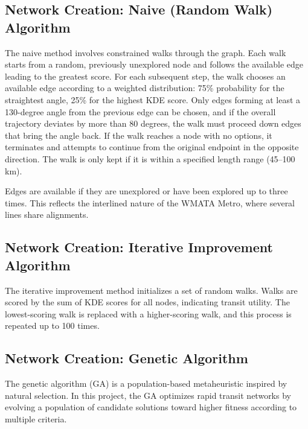 \documentclass[sigconf,nonacm]{acmart}
\begin{document}
\subsection{Network Creation: Naive (Random Walk) Algorithm}

The naive method involves constrained walks through the graph. Each walk starts from a random, previously unexplored node and follows the available edge leading to the greatest score. For each subsequent step, the walk chooses an available edge according to a weighted distribution: 75\% probability for the straightest angle, 25\% for the highest KDE score. Only edges forming at least a 130-degree angle from the previous edge can be chosen, and if the overall trajectory deviates by more than 80 degrees, the walk must proceed down edges that bring the angle back. If the walk reaches a node with no options, it terminates and attempts to continue from the original endpoint in the opposite direction. The walk is only kept if it is within a specified length range (45--100 km).

Edges are available if they are unexplored or have been explored up to three times. This reflects the interlined nature of the WMATA Metro, where several lines share alignments.

\subsection{Network Creation: Iterative Improvement Algorithm}

The iterative improvement method initializes a set of random walks. Walks are scored by the sum of KDE scores for all nodes, indicating transit utility. The lowest-scoring walk is replaced with a higher-scoring walk, and this process is repeated up to 100 times.

\subsection{Network Creation: Genetic Algorithm}
The genetic algorithm (GA) is a population-based metaheuristic inspired by natural selection. In this project, the GA optimizes rapid transit networks by evolving a population of candidate solutions toward higher fitness according to multiple criteria.
\end{document}

